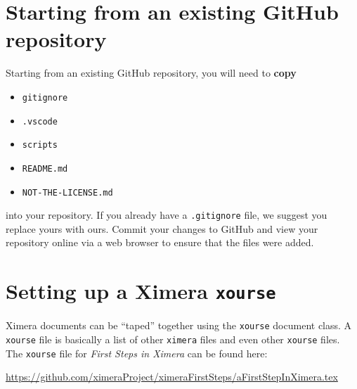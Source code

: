 \documentclass{ximera}
\begin{document}
\section{Starting from an existing GitHub repository}

Starting from an existing GitHub repository, you will need to \textbf{copy}
\begin{itemize}
  \item \texttt{gitignore}
  \item \texttt{.vscode}
  \item \texttt{scripts}
  \item \texttt{README.md}
  \item \texttt{NOT-THE-LICENSE.md}
\end{itemize}
into your repository. If you already have a \verb|.gitignore| file, we suggest
you replace yours with ours. Commit your changes to GitHub and view your
repository online via a web browser to ensure that the files were added.

\section{Setting up a Ximera \texttt{xourse}}

Ximera documents can be ``taped'' together using the \texttt{xourse} document
class.
A \verb|xourse| file is basically a list of other \verb|ximera| files and even
other \verb|xourse| files.
The \verb|xourse| file for \textit{First Steps in Ximera} can be found here:
\begin{center}

  \url{https://github.com/ximeraProject/ximeraFirstSteps/aFirstStepInXimera.tex}
\end{center}
\end{document}
